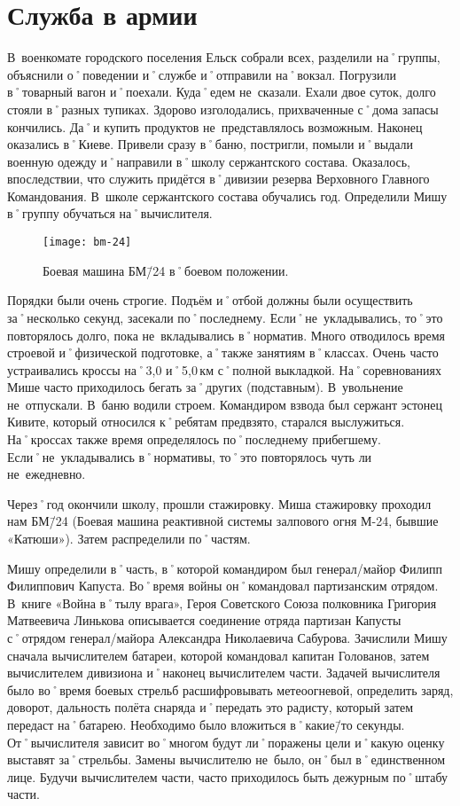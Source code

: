 ﻿\chapter{Служба в армии}
В~военкомате городского поселения Ельск собрали всех, разделили на˚группы, объяснили о˚поведении и˚службе и˚отправили на˚вокзал. Погрузили в˚товарный вагон и˚поехали. Куда˚едем не~сказали. Ехали двое суток, долго стояли в˚разных тупиках. Здорово изголодались, прихваченные с˚дома запасы кончились. Да˚и купить продуктов не~представлялось возможным. Наконец оказались в˚Киеве. Привели сразу в˚баню, постригли, помыли и˚выдали военную одежду и˚направили в˚школу сержантского состава. Оказалось, впоследствии, что служить придётся в˚дивизии резерва Верховного Главного Командования. В~школе сержантского состава обучались год. Определили Мишу в˚группу обучаться на˚вычислителя.

\begin{wrapfigure}{O}{.4\textwidth}
\centering
\texttt{[image: bm-24]}
\caption[Боевая машина БМ\=/24 в˚боевом положении.]{Боевая машина БМ\=/24 в˚боевом положении\footnotemark.}
\label{fig:bm-24}
\end{wrapfigure}

Порядки были очень строгие. Подъём и˚отбой должны были осуществить за˚несколько секунд, засекали по˚последнему. Если˚не~укладывались, то˚это повторялось долго, пока не~вкладывались в˚норматив. Много отводилось время строевой и˚физической подготовке, а˚также занятиям в˚классах. Очень часто устраивались кроссы на˚3,0 и˚5,0\,км с˚полной выкладкой. На˚соревнованиях Мише часто приходилось бегать за˚других (подставным). В~увольнение не~отпускали. В~баню водили строем. Командиром взвода был сержант эстонец Кивите, который относился к˚ребятам предвзято, старался выслужиться. На˚кроссах также время определялось по˚последнему прибегшему. Если˚не~укладывались в˚нормативы, то˚это повторялось чуть ли не~ежедневно. 

Через˚год окончили школу, прошли стажировку. Миша стажировку проходил нам БМ\=/24 (Боевая машина реактивной системы залпового огня М-24, бывшие «Катюши»). Затем распределили по˚частям. 

Мишу определили в˚часть, в˚которой командиром был генерал\-/майор Филипп Филиппович Капуста. Во˚время войны он˚командовал партизанским отрядом. В~книге «Война в˚тылу врага», Героя Советского Союза полковника Григория Матвеевича Линькова описывается соединение отряда партизан Капусты с˚отрядом генерал\-/майора Александра Николаевича Сабурова. Зачислили Мишу сначала вычислителем батареи, которой командовал капитан Голованов, затем вычислителем дивизиона и˚наконец вычислителем части. Задачей вычислителя было во˚время боевых стрельб расшифровывать метеоогневой, определить заряд, доворот, дальность полёта снаряда и˚передать это радисту, который затем передаст на˚батарею. Необходимо было вложиться в˚какие\=/то секунды. От˚вычислителя зависит во˚многом будут ли˚поражены цели и˚какую оценку выставят за˚стрельбы. Замены вычислителю не~было, он˚был в˚единственном лице. Будучи вычислителем части, часто приходилось быть дежурным по˚штабу части. 

